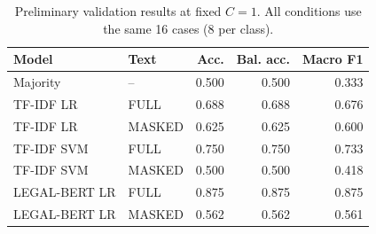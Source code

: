 \begin{table}[t]
\caption{Preliminary validation results at fixed $C=1$. All conditions use the same 16 cases (8 per class).}
\label{tab:results}
\centering\footnotesize
\begin{tabular}{llrrr}
\toprule Model & Text & Acc. & Bal. acc. & Macro F1 \\
\midrule
Majority & -- & 0.500 & 0.500 & 0.333 \\
TF-IDF LR & FULL & 0.688 & 0.688 & 0.676 \\
TF-IDF LR & MASKED & 0.625 & 0.625 & 0.600 \\
TF-IDF SVM & FULL & 0.750 & 0.750 & 0.733 \\
TF-IDF SVM & MASKED & 0.500 & 0.500 & 0.418 \\
LEGAL-BERT LR & FULL & 0.875 & 0.875 & 0.875 \\
LEGAL-BERT LR & MASKED & 0.562 & 0.562 & 0.561 \\
\bottomrule\end{tabular}
\end{table}
